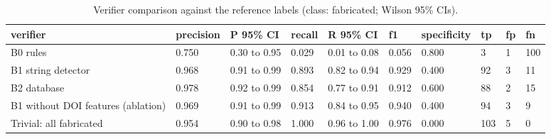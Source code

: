 \begin{table}[t]
\centering
\small
\setlength{\tabcolsep}{3pt}
\caption{Verifier comparison against the reference labels (class: fabricated; Wilson 95\% CIs).}
\label{tab:verifiers}
\begin{tabular}{llllllllll}
\toprule
verifier & precision & P 95\% CI & recall & R 95\% CI & f1 & specificity & tp & fp & fn \\
\midrule
B0 rules & 0.750 & 0.30 to 0.95 & 0.029 & 0.01 to 0.08 & 0.056 & 0.800 & 3 & 1 & 100 \\
B1 string detector & 0.968 & 0.91 to 0.99 & 0.893 & 0.82 to 0.94 & 0.929 & 0.400 & 92 & 3 & 11 \\
B2 database & 0.978 & 0.92 to 0.99 & 0.854 & 0.77 to 0.91 & 0.912 & 0.600 & 88 & 2 & 15 \\
B1 without DOI features (ablation) & 0.969 & 0.91 to 0.99 & 0.913 & 0.84 to 0.95 & 0.940 & 0.400 & 94 & 3 & 9 \\
Trivial: all fabricated & 0.954 & 0.90 to 0.98 & 1.000 & 0.96 to 1.00 & 0.976 & 0.000 & 103 & 5 & 0 \\
\bottomrule
\end{tabular}
\end{table}
